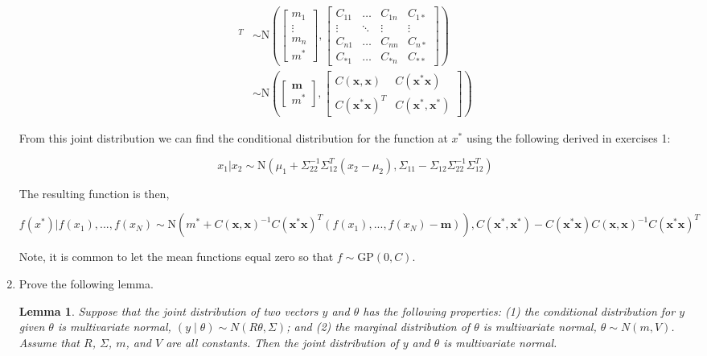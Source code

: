 \documentclass[10pt]{article}
\newtheorem{lemma}[theorem]{Lemma}
\begin{document}
\begin{enumerate}[label=(\Alph*)]
        \begin{align*}
            [f(x_1), ... , f(x_N), f(x^*)]^T &\sim \text{N} \left( \begin{bmatrix}m_1 \\ \vdots \\ m_n \\ m^*\end{bmatrix}, \begin{bmatrix}C_{11} & \dots & C_{1n} & C_{1 *}\\ \vdots & \ddots & \vdots & \vdots \\ C_{n1} & \dots & C_{nn} & C_{n*} \\ C_{*1} & \dots & C_{*n} & C_{**} \end{bmatrix}\right) \\
            & \sim \text{N} \left ( \begin{bmatrix} \mathbf{m} \\ m^*\end{bmatrix}, \begin{bmatrix} C(\mathbf{x, x}) & C(\mathbf{x^*x}) \\ C(\mathbf{x^*x})^T & C(\mathbf{x^*, x^*})\end{bmatrix}\right)
        \end{align*}

        From this joint distribution we can find the conditional distribution for the function at $x^*$ using the following derived in exercises 1:

        $$x_1 | x_2 \sim \text{N}(\mu_1 + \Sigma_{22}^{-1} \Sigma_{12}^T(x_2 - \mu_2), \Sigma_{11} - \Sigma_{12} \Sigma_{22}^{-1}\Sigma_{12}^T)$$

        The resulting function is then,

        $$f(x^*) | f(x_1), ..., f(x_N) \sim \text{N} \left ( m^* + C(\mathbf{x, x})^{-1}C(\mathbf{x^*x})^T(f(x_1), ...,f(x_N) - \mathbf{m})\right), C(\mathbf{x^*, x^*}) - C(\mathbf{x^*x}) C(\mathbf{x, x})^{-1} C(\mathbf{x^*x})^T $$

        Note, it is common to let the mean functions equal zero so that $f \sim \mbox{GP}(0, C).$

        \item Prove the following lemma.

        \begin{lemma}
        Suppose that the joint distribution of two vectors $y$ and $\theta$ has the following properties: (1) the conditional distribution for $y$ given $\theta$ is multivariate normal, $(y \mid \theta) \sim N(R\theta, \Sigma)$; and (2) the marginal distribution of $\theta$ is multivariate normal, $\theta \sim N(m,V)$.  Assume that $R$, $\Sigma$, $m$, and $V$ are all constants.  Then the joint distribution of $y$ and $\theta$ is multivariate normal.
        \end{lemma}


\end{enumerate}
\end{document}
